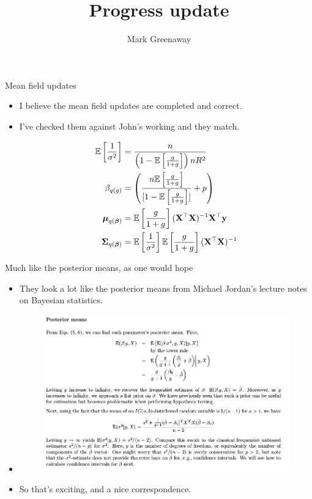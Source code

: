 \documentclass{beamer}
\title{Progress update}
\author{Mark Greenaway}
\begin{document}
\begin{frame}
\titlepage
\end{frame}

\begin{frame}{Mean field updates}
\begin{itemize}
\item I believe the mean field updates are completed and correct.
\item I've checked them against John's working and they match.

\begin{align*}
\mathbb{E}\left[\frac{1}{\sigma^2}\right] &= \frac{n}{\left(1 - \mathbb{E}\left[\frac{g}{1 + g}\right]\right) n R^2} \\
\beta_{q(g)} &= \left(\frac{n \mathbb{E}\left[\frac{g}{1 + g}\right]}{[1 - \mathbb{E}\left[\frac{g}{1 + g}\right]]} + p \right) \\
{\boldsymbol \mu}_{q({\boldsymbol \beta})} &= \mathbb{E}\left[\frac{g}{1 + g}\right] ({\bf X}^\top {\bf X})^{-1} {\bf X}^\top {\bf y} \\
{\boldsymbol \Sigma}_{q({\boldsymbol \beta})} &= \mathbb{E}\left[\frac{1}{\sigma^2}\right] \mathbb{E}\left[\frac{g}{1 + g}\right]({\bf X}^\top {\bf X})^{-1} \\
\end{align*}
\end{itemize}
\end{frame}

\begin{frame}{Much like the posterior means, as one would hope}
\begin{itemize}
\item They look a lot like the posterior means from Michael Jordan's lecture notes on Bayesian
statistics.
\item \begin{figure}
\includegraphics[scale=.3]{Michael_Jordan_Linear_model_with_g_prior_posterior.png}
\end{figure}
\item So that's exciting, and a nice correspondence.
\end{itemize}
\end{frame}
\end{document}
